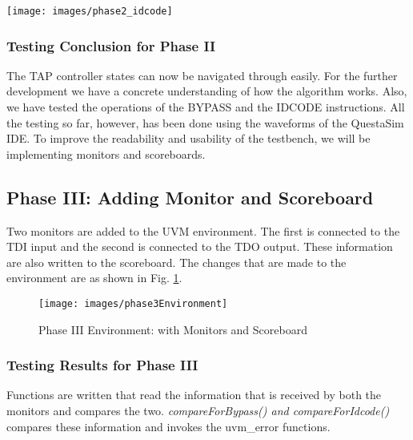 \documentclass[a4paper,11pt]{article}
\begin{document}
\newpage
\pagebreak

\begin{sidewaysfigure}[ht]
\centering
\texttt{[image: images/phase2\_idcode]}
\caption{IDCODE testing\\a. 32 bit IDCODE is shifted out to the TDO. This can be verified from the waveform.\\b. The IDCODE of the DUT is h149511c3}
\label{fig:IDCODE LandscapeFigure}
\end{sidewaysfigure}

\FloatBarrier
\subsubsection{Testing Conclusion for Phase II}
The TAP controller states can now be navigated through easily. For the further development we have a concrete understanding of how the algorithm works. Also, we have tested the operations of the BYPASS and the IDCODE instructions. All the testing so far, however, has been done using the waveforms of the QuestaSim IDE. To improve the readability and usability of the testbench, we will be implementing monitors and scoreboards.


\FloatBarrier
\subsection{Phase III: Adding Monitor and Scoreboard}
Two monitors are added to the UVM environment. The first is connected to the TDI input and the second is connected to the TDO output. These information are also written to the scoreboard. The changes that are made to the environment are as shown in Fig. \ref{fig:Phase III Environment}.

\begin{figure}[ht]
\centering
\texttt{[image: images/phase3Environment]}
\caption{Phase III Environment: with Monitors and Scoreboard}
\label{fig:Phase III Environment}
\end{figure}

\subsubsection{Testing Results for Phase III}

Functions are written that read the information that is received by both the monitors and compares the two. \textit{compareForBypass() and compareForIdcode()} compares these information and invokes the uvm\_error functions.
\end{document}

